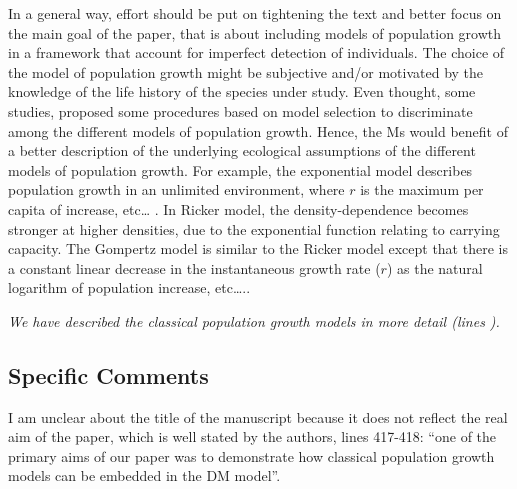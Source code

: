 \documentclass[12pt,english]{article}
\begin{document}
\begin{spacing}{1.9}
\begin{flushleft}
In a general way, effort should be put on tightening the text and better focus
on the main goal of the paper, that is about including models of population
growth in a framework that account for imperfect detection of individuals. The
choice of the model of population growth might be subjective and/or motivated by
the knowledge of the life history of the species under study. Even thought, some
studies, proposed some procedures based on model selection to discriminate among
the different models of population growth. Hence, the Ms would benefit of a
better description of the underlying ecological assumptions of the different
models of population growth. For example, the exponential model describes
population growth in an unlimited environment, where $r$ is the maximum per capita
of increase, etc… . In Ricker model, the density-dependence becomes stronger at
higher densities, due to the exponential function relating to carrying capacity.
The Gompertz model is similar to the Ricker model except that there is a
constant linear decrease in the instantaneous growth rate ($r$) as the natural
logarithm of population increase, etc…..

\vspace{0.5cm}
\textit{We have described the classical population growth models in more 
detail (lines ).}
\vspace{0.5cm}

\subsection*{Specific Comments}
I am unclear about the title of the manuscript because it does not reflect the real aim of the
paper, which is well stated by the authors, lines 417-418: ``one of the primary aims of our
paper was to demonstrate how classical population growth models can be embedded in the
DM model''.


\end{flushleft}
\end{spacing}
\end{document}
